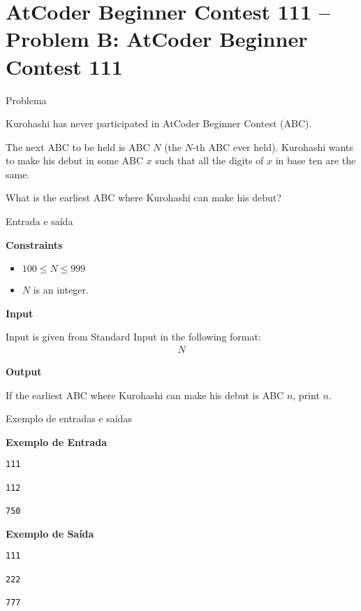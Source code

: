 \section{AtCoder Beginner Contest 111 -- Problem B: AtCoder Beginner Contest 111}

\begin{frame}[fragile]{Problema}

Kurohashi has never participated in AtCoder Beginner Contest (ABC).

The next ABC to be held is ABC $N$ (the $N$-th ABC ever held). Kurohashi wants to make his debut 
in some ABC $x$ such that all the digits of $x$ in base ten are the same.

What is the earliest ABC where Kurohashi can make his debut?

\end{frame}

\begin{frame}[fragile]{Entrada e saída}

\textbf{Constraints}

\begin{itemize}
    \item $100\leq N\leq 999$
    \item $N$ is an integer.
\end{itemize}

\textbf{Input}

Input is given from Standard Input in the following format:
\begin{align*}
N
\end{align*}

\textbf{Output}

If the earliest ABC where Kurohashi can make his debut is ABC $n$, print $n$.

\end{frame}

\begin{frame}[fragile]{Exemplo de entradas e saídas}

\begin{minipage}[t]{0.5\textwidth}
\textbf{Exemplo de Entrada}
\begin{verbatim}
111

112

750
\end{verbatim}
\end{minipage}
\begin{minipage}[t]{0.45\textwidth}
\textbf{Exemplo de Saída}
\begin{verbatim}
111

222

777
\end{verbatim}
\end{minipage}
\end{frame}

